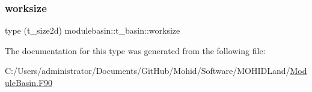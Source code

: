 \subsubsection{\texorpdfstring{worksize}{worksize}}
{\footnotesize\ttfamily type (t\+\_\+size2d) modulebasin\+::t\+\_\+basin\+::worksize\hspace{0.3cm}{\ttfamily [private]}}



The documentation for this type was generated from the following file\+:\begin{DoxyCompactItemize}
\item 
C\+:/\+Users/administrator/\+Documents/\+Git\+Hub/\+Mohid/\+Software/\+M\+O\+H\+I\+D\+Land/\mbox{\hyperlink{_module_basin_8_f90}{Module\+Basin.\+F90}}\end{DoxyCompactItemize}
